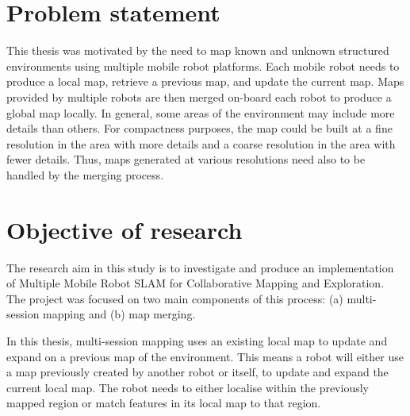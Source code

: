 
\section{Problem statement}
\label{sec:ch1.section2}
This thesis was motivated by the need to map known and unknown structured environments using multiple mobile robot platforms. Each mobile robot needs to produce a local map, retrieve a previous map, and update the current map. Maps provided by multiple robots are then merged on-board each robot to produce a global map locally. In general, some areas of the environment may include more details than others. For compactness purposes, the map could be built at a fine resolution in the area with more details and a coarse resolution in the area with fewer details. Thus, maps generated at various resolutions need also to be handled by the merging process.


\section{Objective of research}
\label{sec:ch1.section3}
The research aim in this study is to investigate and produce an implementation of Multiple Mobile Robot SLAM for Collaborative Mapping and Exploration. The project was focused on two main components of this process: (a) multi-session mapping and (b) map merging.

In this thesis, multi-session mapping uses an existing local map to update and expand on a previous map of the environment. This means a robot will either use a map previously created by another robot or itself, to update and expand the current local map. The robot needs to either localise within the previously mapped region or match features in its local map to that region.

